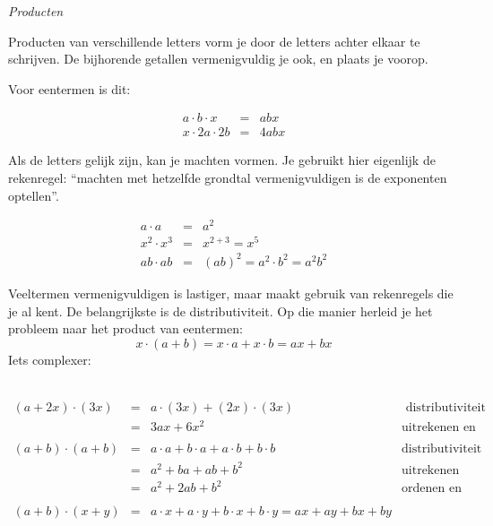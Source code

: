 	\emph{Producten}
	
	Producten van verschillende letters vorm je door de letters achter
	elkaar te schrijven. De bijhorende getallen vermenigvuldig je ook,
	en plaats je voorop. 
	
	Voor eentermen is dit:
	
	\begin{voorbeeld}
		
	\begin{eqnarray*}
		a\cdot b\cdot x&=&abx\\
		x\cdot2a\cdot2b&=&4abx
	\end{eqnarray*}
	\end{voorbeeld}
	
	Als de letters gelijk zijn, kan je machten vormen. Je gebruikt
	hier eigenlijk de rekenregel: ``machten met hetzelfde grondtal vermenigvuldigen
	is de exponenten optellen''.
	
	\begin{voorbeeld}
		\begin{eqnarray*}
		a\cdot a&=&a^{2}\\
		x^{2}\cdot x^{3}&=&x^{2+3}=x^{5}\\
		ab\cdot ab&=&(ab)^{2}=a^{2}\cdot b^{2}=a^{2}b^{2}
		\end{eqnarray*}
	\end{voorbeeld}

	Veeltermen vermenigvuldigen is lastiger, maar maakt gebruik
	van rekenregels die je al kent. De belangrijkste is de distributiviteit.
	Op die manier herleid je het probleem naar het product van eentermen:
	\begin{equation*}
	x\cdot(a+b)=x\cdot a+x\cdot b=ax+bx
	\end{equation*}
	Iets complexer: 
	\begin{voorbeeld}
		\ \\
			\begin{math}
		\begin{array}{rcl|r}
		(a+2x)\cdot(3x) & = & a\cdot(3x)+(2x)\cdot(3x) & \text{ distributiviteit}\\
		& = & 3ax+6x^{2} & \text{uitrekenen en ordenen}\\
		& & & \\
		(a+b)\cdot(a+b) & = & a\cdot a+b\cdot a+a\cdot b+b\cdot b &  \text{distributiviteit}\\
		& = & a^{2}+ba+ab+b^{2} &  \text{uitrekenen}\\
		& = & a^{2}+2ab+b^{2} &  \text{ordenen en optellen}\\
		& &  & \\
		(a+b)\cdot(x+y) & = & a\cdot x+a\cdot y+b\cdot x+b\cdot y=ax+ay+bx+by\\
		\end{array}
		\end{math}
	\end{voorbeeld}


